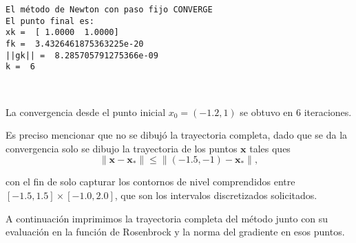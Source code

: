 \documentclass[11pt]{article}
\begin{document}
    \begin{Verbatim}[commandchars=\\\{\}]
El método de Newton con paso fijo CONVERGE
El punto final es:
xk =  [ 1.0000  1.0000]
fk =  3.4326461875363225e-20
||gk|| =  8.285705791275366e-09
k =  6
    \end{Verbatim}

    \begin{center}
    \end{center}
    { \hspace*{\fill} \\}
    
    La convergencia desde el punto inicial \(x_0=(-1.2,1)\) se obtuvo en 6
iteraciones.

Es preciso mencionar que no se dibujó la trayectoria completa, dado que
se da la convergencia solo se dibujo la trayectoria de los puntos
\(\mathbf{x}\) tales ques
\[\lVert \mathbf{x}-\mathbf{x}_\ast \rVert \leq \lVert (-1.5,-1)-\mathbf{x}_\ast \rVert,\]

con el fin de solo capturar los contornos de nivel comprendidos entre
\([-1.5,1.5]\times [-1.0,2.0]\), que son los intervalos discretizados
solicitados.

A continuación imprimimos la trayectoria completa del método junto con
su evaluación en la función de Rosenbrock y la norma del gradiente en
esos puntos.
\end{document}
